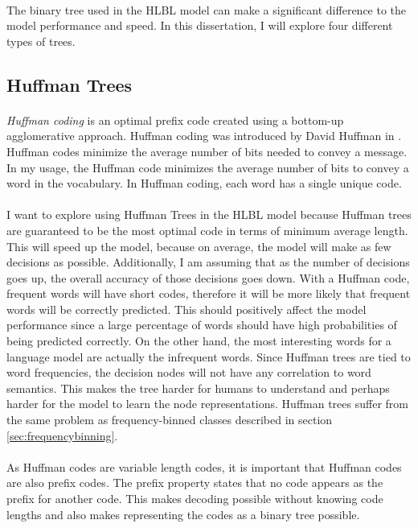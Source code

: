 \paragraph{}
The binary tree used in the HLBL model can make a significant difference to the model performance and speed. In this dissertation, I will explore four different types of trees.
\subsection{Huffman Trees}
\paragraph{}
\emph{Huffman coding} is an optimal prefix code created using a bottom-up agglomerative approach. Huffman coding was introduced by David Huffman in \cite{Huffman1952}. Huffman codes minimize the average number of bits needed to convey a message. In my usage, the Huffman code minimizes the average number of bits to convey a word in the vocabulary. In Huffman coding, each word has a single unique code.
\paragraph{}
I want to explore using Huffman Trees in the HLBL model because Huffman trees are guaranteed to be the most optimal code in terms of minimum average length. This will speed up the model, because on average, the model will make as few decisions as possible. Additionally, I am assuming that as the number of decisions goes up, the overall accuracy of those decisions goes down. With a Huffman code, frequent words will have short codes, therefore it will be more likely that frequent words will be correctly predicted. This should positively affect the model performance since a large percentage of words should have high probabilities of being predicted correctly. On the other hand, the most interesting words for a language model are actually the infrequent words.  Since Huffman trees are tied to word frequencies, the decision nodes will not have any correlation to word semantics. This makes the tree harder for humans to understand and perhaps harder for the model to learn the node representations.  Huffman trees suffer from the same problem as frequency-binned classes described in section \ref{sec:frequencybinning}.
\paragraph{}
As Huffman codes are variable length codes, it is important that Huffman codes are also prefix codes. The prefix property states that no code appears as the prefix for another code. This makes decoding possible without knowing code lengths and also makes representing the codes as a binary tree possible. 
